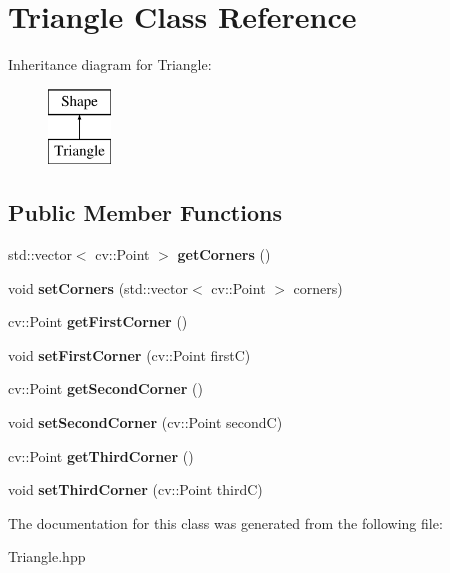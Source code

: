 \hypertarget{class_triangle}{}\section{Triangle Class Reference}
\label{class_triangle}
Inheritance diagram for Triangle\+:\begin{figure}[H]
\begin{center}
\leavevmode
\includegraphics[height=2.000000cm]{class_triangle}
\end{center}
\end{figure}
\subsection*{Public Member Functions}
\begin{DoxyCompactItemize}
\item 
\mbox{\label{class_triangle_a0c77555fd0e47f1344c23fa880f43777}} 
std\+::vector$<$ cv\+::\+Point $>$ {\bfseries get\+Corners} ()
\item 
\mbox{\label{class_triangle_ad2d4cecee7e87e10d8b2787199d784c2}} 
void {\bfseries set\+Corners} (std\+::vector$<$ cv\+::\+Point $>$ corners)
\item 
\mbox{\label{class_triangle_a093007fb968affbfb2dbd7af8aa630a9}} 
cv\+::\+Point {\bfseries get\+First\+Corner} ()
\item 
\mbox{\label{class_triangle_a72e1915b94d2080fb36189bd99ef0fc6}} 
void {\bfseries set\+First\+Corner} (cv\+::\+Point firstC)
\item 
\mbox{\label{class_triangle_a7f851c5d22c1f01278f4a84ee22ad9eb}} 
cv\+::\+Point {\bfseries get\+Second\+Corner} ()
\item 
\mbox{\label{class_triangle_af9db6776f7e3ab5429de047b9fd1e84d}} 
void {\bfseries set\+Second\+Corner} (cv\+::\+Point secondC)
\item 
\mbox{\label{class_triangle_ae159eb9c9cfdb505acaacb8c3b901151}} 
cv\+::\+Point {\bfseries get\+Third\+Corner} ()
\item 
\mbox{\label{class_triangle_ab1c730c92808d3b6d6b725fadd40639c}} 
void {\bfseries set\+Third\+Corner} (cv\+::\+Point thirdC)
\end{DoxyCompactItemize}


The documentation for this class was generated from the following file\+:\begin{DoxyCompactItemize}
\item 
Triangle.\+hpp\end{DoxyCompactItemize}
